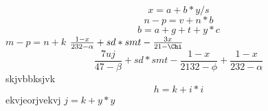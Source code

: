 $$x=a+b*y/s$$
$$n-p=v+n*b$$
\begin{equation}b=a+g+t+y*c\end{equation}
\(m-p=n+k\)
$\frac{1 - x}{232 - \alpha} + sd*smt -\frac{3x}{21 - \Chi}$
\begin{equation}\frac{7uj}{47 - \beta} + sd*smt -\frac{1 - x}{2132 - \phi} + \frac{1 - x}{232 - \alpha}\end{equation}
skjvbbksjvk $$h=k+i*i$$ ekvjeorjvekvj
$j=k+y*y$